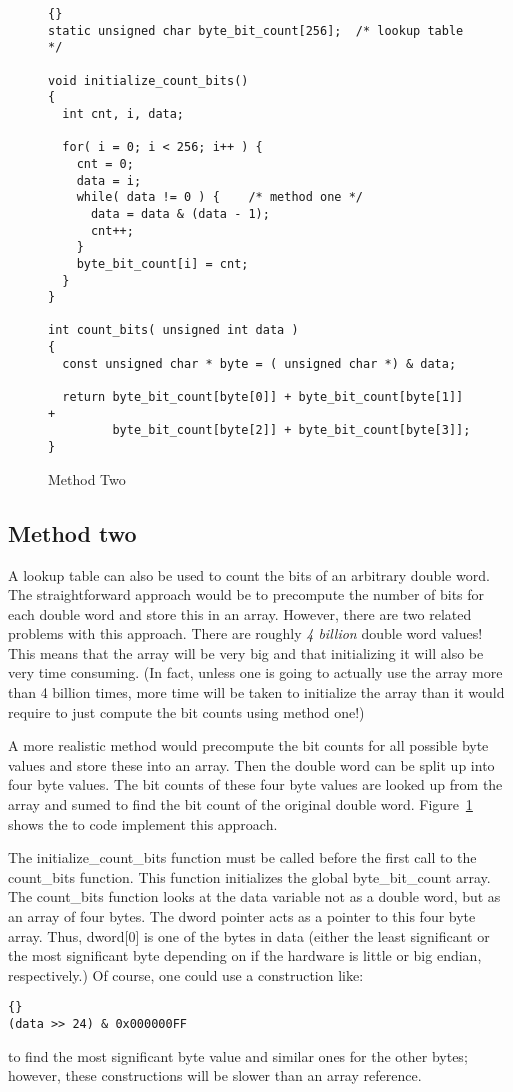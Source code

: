 \begin{figure}[t]
\begin{lstlisting}[frame=tlrb]{}
static unsigned char byte_bit_count[256];  /* lookup table */

void initialize_count_bits()
{
  int cnt, i, data;

  for( i = 0; i < 256; i++ ) {
    cnt = 0;
    data = i;
    while( data != 0 ) {	/* method one */
      data = data & (data - 1);
      cnt++;
    }
    byte_bit_count[i] = cnt;
  }
}

int count_bits( unsigned int data )
{
  const unsigned char * byte = ( unsigned char *) & data;

  return byte_bit_count[byte[0]] + byte_bit_count[byte[1]] +
         byte_bit_count[byte[2]] + byte_bit_count[byte[3]];
}
\end{lstlisting}
\caption{Method Two \label{fig:meth2}}
\end{figure}

\subsection{Method two}

A lookup table can also be used to count the bits of an arbitrary double
word. The straightforward approach would be to precompute the number of bits
for each double word and store this in an array. However, there are two
related problems with this approach. There are roughly \emph{4 billion}
double word values! This means that the array will be very big and that
initializing it will also be very time consuming. (In fact, unless one is 
going to actually use the array more than 4 billion times, more time will
be taken to initialize the array than it would require to just compute the
bit counts using method one!)

A more realistic method would precompute the bit counts for all possible
byte values and store these into an array. Then the double word can be
split up into four byte values. The bit counts of these four byte values
are looked up from the array and sumed to find the bit count of the 
original double word. Figure~\ref{fig:meth2} shows the to code implement
this approach.

The {\code initialize\_count\_bits} function must be called before the
first call to the {\code count\_bits} function. This function initializes
the global {\code byte\_bit\_count} array. The {\code count\_bits} function
looks at the {\code data} variable not as a double word, but as an array
of four bytes. The {\code dword} pointer acts as a pointer to this
four byte array. Thus, {\code dword[0]} is one of the bytes in {\code
data} (either the least significant or the most significant byte depending 
on if the hardware is little or big endian, respectively.) Of course, one
could use a construction like:
\begin{lstlisting}[stepnumber=0]{}
(data >> 24) & 0x000000FF
\end{lstlisting}
\noindent to find the most significant byte value and similar ones for the 
other bytes; however, these constructions will be slower than an array
reference.

